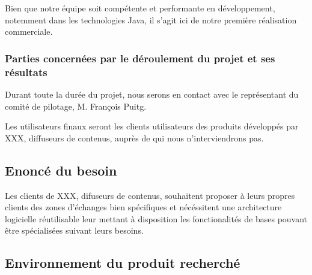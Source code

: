 Bien que notre équipe soit compétente et performante en développement, notemment dans les technologies Java, il s'agit ici de notre première réalisation commerciale.



\subsubsection{Parties concernées par le déroulement du projet et ses résultats}

Durant toute la durée du projet, nous serons en contact avec le représentant du comité de
pilotage, M. François Puitg.

Les utilisateurs finaux seront les clients utilisateurs des produits développés par XXX,
diffuseurs de contenus, auprès de qui nous n'interviendrons pas.

\subsection{Enoncé du besoin}
Les clients de XXX, difuseurs de contenus, souhaitent proposer à leurs propres clients des
zones d'échanges bien spécifiques et nécéssitent une architecture logicielle réutilisable leur mettant à disposition les fonctionalités de bases pouvant être spécialisées suivant leurs besoins.

\subsection{Environnement du produit recherché}

